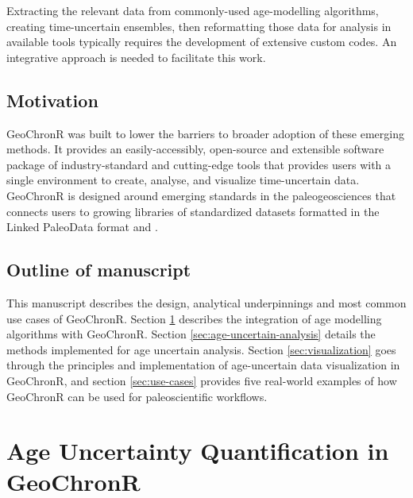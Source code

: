 \documentclass[gc, manuscript]{copernicus}
\begin{document}
Extracting the relevant data from commonly-used age-modelling
algorithms, creating time-uncertain ensembles, then reformatting those
data for analysis in available tools typically requires the development
of extensive custom codes. An integrative approach is needed to
facilitate this work.

\subsection{Motivation}

GeoChronR was built to lower the barriers to broader adoption of these
emerging methods. It provides an easily-accessibly, open-source and
extensible software package of industry-standard and cutting-edge tools
that provides users with a single environment to create, analyse, and
visualize time-uncertain data. GeoChronR is designed around emerging
standards in the paleogeosciences that connects users to growing
libraries of standardized datasets formatted in the Linked PaleoData
format \citep{LiPD} and \citep{neotoma}.

\subsection{Outline of manuscript}

This manuscript describes the design, analytical underpinnings and most
common use cases of GeoChronR. Section \ref{sec:age-modeling} describes
the integration of age modelling algorithms with GeoChronR. Section
\ref{sec:age-uncertain-analysis} details the methods implemented for age
uncertain analysis. Section \ref{sec:visualization} goes through the
principles and implementation of age-uncertain data visualization in
GeoChronR, and section \ref{sec:use-cases} provides five real-world
examples of how GeoChronR can be used for paleoscientific workflows.

\section{Age Uncertainty Quantification in
GeoChronR}\label{sec:age-modeling}
\end{document}
